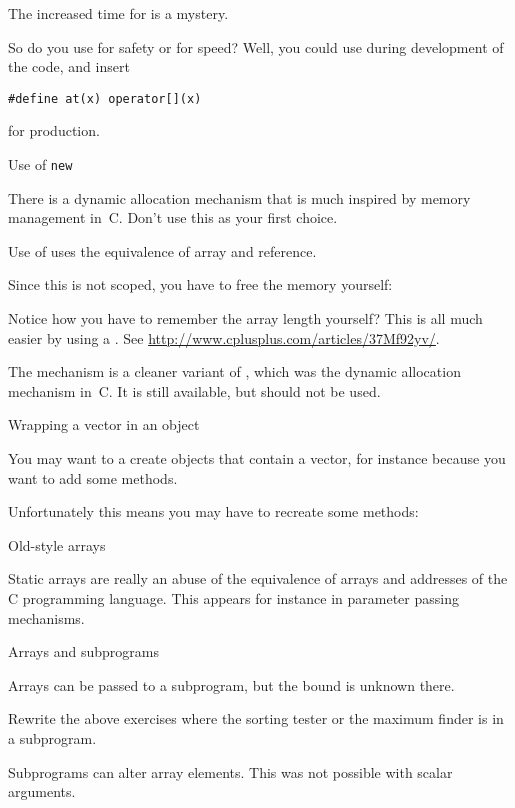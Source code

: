 The increased time for  is a mystery.

So do you use  for safety or \n{[]} for speed? Well, you could
use  during development of the code, and insert
\begin{verbatim}
#define at(x) operator[](x)
\end{verbatim}
for production.

 {Use of \texttt{new}}

\prerequisite{\ref{sec:arraypointer}}

There is a dynamic allocation mechanism that is much inspired by
memory management in~C. Don't use this as your first choice.

Use of  uses the 
equivalence of array and reference.
%

Since this is not scoped, you have to free the memory yourself:
%

Notice how you have to remember the array length yourself? This is all
much easier by using a . See
\url{http://www.cplusplus.com/articles/37Mf92yv/}.

The  mechanism is a cleaner variant of ,
which was the dynamic allocation mechanism in~C. It is still
available, but should not be used.

 {Wrapping a vector in an object}

You may want to a create objects that contain a vector, for instance
because you want to add some methods.
%

Unfortunately this means you may have to recreate some methods:
%

 {Old-style arrays}

Static arrays are really an abuse of the equivalence of arrays and
addresses of the C programming language. This appears for instance in
parameter passing mechanisms.

 {Arrays and subprograms}

Arrays can be passed to a subprogram, but the bound is unknown there.
%
%
\begin{exercise}
  Rewrite the above exercises where the sorting tester or the maximum
  finder is in a subprogram.
\end{exercise}

Subprograms can alter array elements. This was not possible with
scalar arguments.

